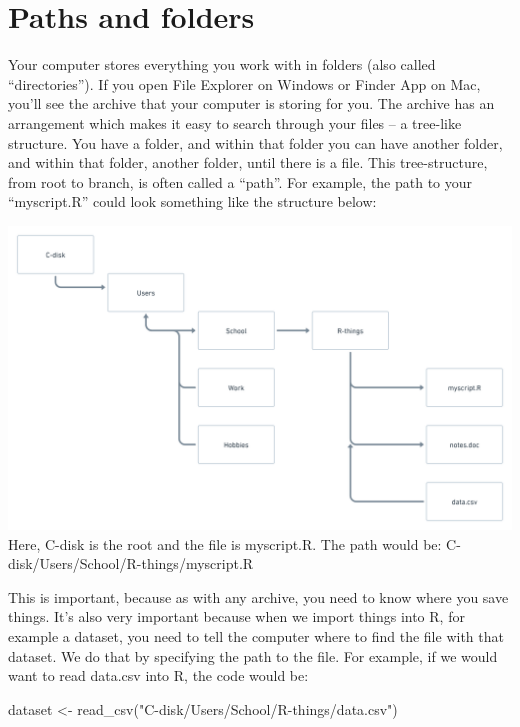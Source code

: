 \documentclass[
]{article}
\newenvironment{Shaded}{\begin{snugshade}}{\end{snugshade}}
\newcommand{\FunctionTok}[1]{\textcolor[rgb]{0.00,0.00,0.00}{#1}}
\newcommand{\NormalTok}[1]{#1}
\newcommand{\OtherTok}[1]{\textcolor[rgb]{0.56,0.35,0.01}{#1}}
\newcommand{\StringTok}[1]{\textcolor[rgb]{0.31,0.60,0.02}{#1}}
\begin{document}
\hypertarget{paths-and-folders}{%
\section{Paths and folders}\label{paths-and-folders}}

Your computer stores everything you work with in folders (also called
``directories''). If you open File Explorer on Windows or Finder App on
Mac, you'll see the archive that your computer is storing for you. The
archive has an arrangement which makes it easy to search through your
files -- a tree-like structure. You have a folder, and within that
folder you can have another folder, and within that folder, another
folder, until there is a file. This tree-structure, from root to branch,
is often called a ``path''. For example, the path to your ``myscript.R''
could look something like the structure below:

\includegraphics[width=1\textwidth,height=\textheight]{./figures/rfolders.png}
Here, C-disk is the root and the file is myscript.R. The path would be:
C-disk/Users/School/R-things/myscript.R

This is important, because as with any archive, you need to know where
you save things. It's also very important because when we import things
into R, for example a dataset, you need to tell the computer where to
find the file with that dataset. We do that by specifying the path to
the file. For example, if we would want to read data.csv into R, the
code would be:

\begin{Shaded}
\begin{Highlighting}[]
\NormalTok{dataset }\OtherTok{\textless{}{-}} \FunctionTok{read\_csv}\NormalTok{(}\StringTok{"C{-}disk/Users/School/R{-}things/data.csv"}\NormalTok{)}
\end{Highlighting}
\end{Shaded}
\end{document}
